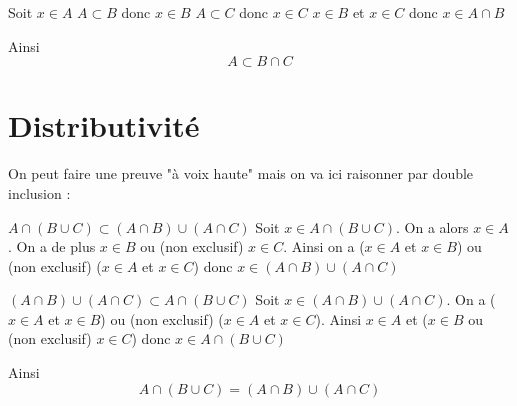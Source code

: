 \newline

\begin{preuve}
Soit $x\in A$\newline
$A\subset B$ donc $x\in B$\newline
$A \subset C$ donc $x\in C$\newline
$x \in B$ et $x\in C$ donc $x\in A\cap B$\newline

Ainsi 
$$A \subset B\cap C$$
\end{preuve}
\newline


\section{Distributivité}
\newline

\begin{preuve}
On peut faire une preuve "à voix haute" mais on va ici raisonner par double inclusion : \newline


\underline{$A \cap (B\cup C) \subset (A\cap B)\cup (A\cap C)$}\newline
Soit $x \in A \cap (B\cup C)$. On a alors $x\in A$. On a de plus $x\in B$ ou (non exclusif) $x\in C$. Ainsi on a ($x\in A$ et $x\in B$) ou (non exclusif) ($x \in A$ et $x\in C$) donc $x\in (A\cap B)\cup (A\cap C)$\newline

\underline{$(A\cap B)\cup (A\cap C) \subset A \cap (B\cup C)$}\newline
Soit $x \in (A\cap B)\cup (A\cap C)$. On a ($x\in A$ et $x\in B$) ou (non exclusif) ($x\in A$ et $x \in C$). Ainsi $x\in A$ et ($x\in B$ ou (non exclusif) $x\in C$) donc $x\in A \cap (B\cup C)$\newline

Ainsi 
$$A \cap (B\cup C) = (A\cap B)\cup (A\cap C)$$
\end{preuve}

\newline

